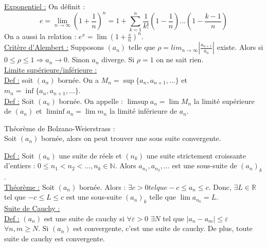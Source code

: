 \documentclass[../main.tex]{subfiles}
\begin{document}
\quad \underline{Exponentiel :} On définit :\\
\begin{equation}
    e = \lim_{n\rightarrow \infty} (1+\frac{1}{n})^n = 1 + \sum_{k=1}^n \frac{1}{k!}(1-\frac{1}{n})\dots (1-\frac{k-1}{n})
\end{equation}
On a aussi la relation : $e^x = \lim (1+\frac{x}{n})^n$.\\


\quad \underline{Critère d'Alembert :} Supposons $(a_n)$ telle que $\rho = lim_{n\rightarrow \infty} |\frac{a_{n+1}}{a_n}|$ existe. Alors si $0\leq \rho \leq 1 \Rightarrow a_n \rightarrow 0$. Sinon $a_n$ diverge. Si $\rho = 1$ on ne sait rien.\\

\quad \underline{Limite supérieure/inférieure :}\\
\underline{Def :} soit $(a_n)$ bornée. On a $M_n = \sup \{a_n, a_{n+1}, \dots\}$ et $m_n = \inf \{a_n, a_{n+1}, \dots\}$.\\

\underline{Def :} Soit $(a_n)$ bornée. On appelle : $\limsup{a_n} = \lim M_n$ la limité supérieure de $(a_n)$ et $\liminf{a_n} = \lim m_n$ la limité inférieure de $a_n$.\\

\begin{theorem}Théorème de Bolzano-Weierstrass :\\Soit $(a_n)$ bornée, alors on peut trouver une sous suite convergente.
\end{theorem}

\underline{Def :} Soit $(a_n)$ une suite de réels et $(n_k)$ une suite strictement croissante d'entiers : $0 \leq n_1 < n_2 < \dots, n_k \in \mathbb{N}$. Alors $a_{n_1}, a_{n_2}, \dots $ est une sous-suite de $(a_n)_k$.\\

\underline{Théorème :} Soit $(a_n)$ bornée. Alors : $\exists c > 0 tel que -c \leq a_n \leq c$. Donc, $\exists L \in \mathbb{R}$ tel que $-c \leq L \leq c$ est une sous-suite $(a_n)_k$ telle que $\lim a_{n_k} = L$.\\

\quad \underline{Suite de Cauchy :}\\
\underline{Def :} $(a_n)$ est une suite de cauchy si $\forall \varepsilon>0$ $ \exists N$ tel que $|a_n - a_m| \leq \varepsilon$  $\forall n,m \geq N$. Si $(a_n)$ est convergente, c'est une suite de cauchy. De plus, toute suite de cauchy est convergente.\\
\end{document}
